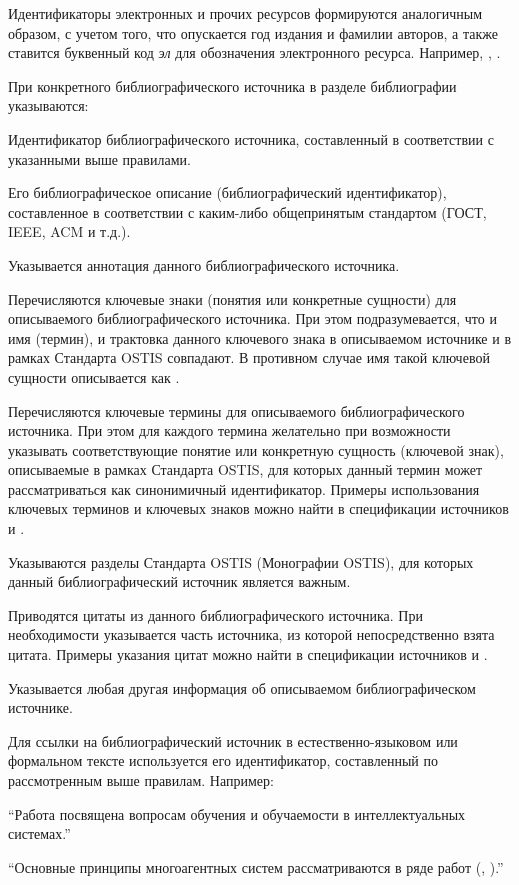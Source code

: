 \begin{partbacktext}
Идентификаторы электронных и прочих ресурсов формируются аналогичным образом, с учетом того, что опускается год издания и фамилии авторов, а также ставится буквенный код \textit{эл} для обозначения электронного ресурса. Например, , .

При  конкретного библиографического источника в разделе библиографии указываются:

\begin{textitemize}
	\item Идентификатор библиографического источника, составленный в соответствии с указанными выше правилами.
	\item Его библиографическое описание (библиографический идентификатор), составленное в соответствии с каким-либо общепринятым стандартом (ГОСТ, IEEE, ACM и т.д.).
	\item Указывается аннотация данного библиографического источника.
	\item Перечисляются ключевые знаки (понятия или конкретные сущности) для описываемого библиографического источника. При этом подразумевается, что и имя (термин), и трактовка данного ключевого знака в описываемом источнике и в рамках Стандарта OSTIS совпадают. В противном случае имя такой ключевой сущности описывается как .
	\item Перечисляются ключевые термины для описываемого библиографического источника. При этом для каждого термина желательно при возможности указывать соответствующие понятие или конкретную сущность (ключевой знак), описываемые в рамках Стандарта OSTIS, для которых данный термин может рассматриваться как синонимичный идентификатор. Примеры использования ключевых терминов и ключевых знаков можно найти в спецификации источников  и .
	\item Указываются разделы Стандарта OSTIS (Монографии OSTIS), для которых данный библиографический источник является важным.
	\item Приводятся цитаты из данного библиографического источника. При необходимости указывается часть источника, из которой непосредственно взята цитата. Примеры указания цитат можно найти в спецификации источников  и .
	\item Указывается любая другая информация об описываемом библиографическом источнике.
\end{textitemize}

Для ссылки на библиографический источник в естественно-языковом или формальном тексте используется его идентификатор, составленный по рассмотренным выше правилам. Например: 

\begin{textitemize}
	\item ``Работа  посвящена вопросам обучения и обучаемости в интеллектуальных системах.''
	\item ``Основные принципы многоагентных систем рассматриваются в ряде работ (, ).''
\end{textitemize}

\end{partbacktext}

